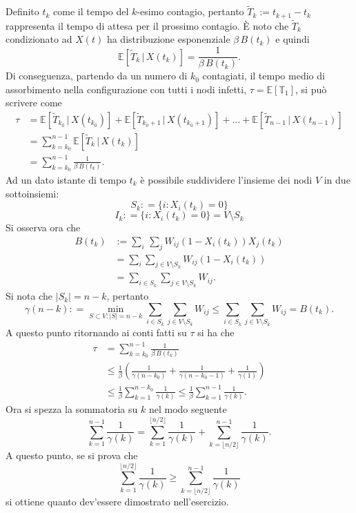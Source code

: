 \begin{alphaparts}
    \questionpart %
    
Definito $t_{k}$ come il tempo del $k$-esimo contagio, pertanto $\tilde{T}_{k} := t_{k+1} - t_{k}$ rappresenta il tempo di attesa per il prossimo contagio. È noto che $\tilde{T}_{k}$ condizionato ad $X(t)$ ha distribuzione esponenziale $\beta\,B(t_{k})$ e quindi
\[\mathbb{E} [ \tilde{T}_{k} \,\vert\, X(t_{k}) ] = \frac{1}{\beta\,B(t_{k})}.\]
Di conseguenza, partendo da un numero di $k_{0}$ contagiati, il tempo medio di assorbimento nella configurazione con tutti i nodi infetti, $\tau = \mathbb{E}[\mathbb{T}_{1}]$, si può scrivere come
\begin{align}
\tau &= \mathbb{E} [ \tilde{T}_{k_{0}} \,\vert\, X(t_{k_{0}}) ] +  \mathbb{E} [ \tilde{T}_{k_{0}+1} \,\vert\, X(t_{k_{0}+1}) ] + ... +  \mathbb{E} [ \tilde{T}_{n-1} \,\vert\, X(t_{n-1}) ] \nonumber\\
&= \sum_{k=k_{0}}^{n-1} \mathbb{E} [ \tilde{T}_{k} \,\vert\, X(t_{k}) ] \nonumber\\
&= \sum_{k=k_{0}}^{n-1} \frac{1}{\beta\,B(t_{k})}.\nonumber
\end{align}
Ad un dato istante di tempo $t_{k}$ è possibile suddividere l'insieme dei nodi $V$ in due sottoinsiemi:
\[ S_{k} : = \{ i : X_{i}(t_{k}) = 0 \} \]
\[ I_{k} : = \{ i : X_{i}(t_{k}) = 0 \} = V\setminus S_{k} \]
Si osserva ora che 
\begin{align}
B(t_{k})  &:= \sum_{i} \,\sum_{j} W_{ij}(1-X_{i}(t_{k}))X_{j}(t_{k}) \nonumber\\
&= \sum_{i} \sum_{j\in V\setminus S_{k} } W_{ij}(1-X_{i}(t_{k}))\nonumber\\
&= \sum_{i\in S_{k}} \sum_{j\in V\setminus S_{k} } W_{ij}.\nonumber
\end{align}
Si nota che \(\vert S_{k} \vert = n-k\), pertanto
\[\gamma(n-k) : = \min_{S\subset V : \vert S \vert = n - k} \sum_{i\in S_{k}} \sum_{j\in V\setminus S_{k} } W_{ij} \le \sum_{i\in S_{k}} \sum_{j\in V\setminus S_{k} } W_{ij} = B(t_{k}). \]
A questo punto ritornando ai conti fatti su $\tau$ si ha che
\begin{align}
\tau &=\sum_{k=k_{0}}^{n-1} \frac{1}{\beta\,B(t_{k})}\nonumber\\
& \le \frac{1}{\beta}\left(\frac{1}{\gamma(n-k_{0})}+\frac{1}{\gamma(n-k_{0}-1)}+\frac{1}{\gamma(1)}\right)\nonumber\\
& \le \frac{1}{\beta} \sum_{k = 1}^{n-k_{0}} \frac{1}{\gamma(k)} \le \frac{1}{\beta} \sum_{k = 1}^{n-1} \frac{1}{\gamma(k)}.\nonumber
\end{align}
Ora si spezza la sommatoria su $k$ nel modo seguente
\[ \sum_{k = 1}^{n-1} \frac{1}{\gamma(k)} = \sum_{k = 1}^{\lfloor n/2\rfloor} \frac{1}{\gamma(k)} + \sum_{k = \lfloor n/2\rfloor}^{n-1} \frac{1}{\gamma(k)}.\]
A questo punto, se si prova che 
\[\sum_{k = 1}^{\lfloor n/2\rfloor} \frac{1}{\gamma(k)} \ge \sum_{k = \lfloor n/2\rfloor}^{n-1} \frac{1}{\gamma(k)} \]
si ottiene quanto dev'essere dimostrato nell'esercizio.


\end{alphaparts}
